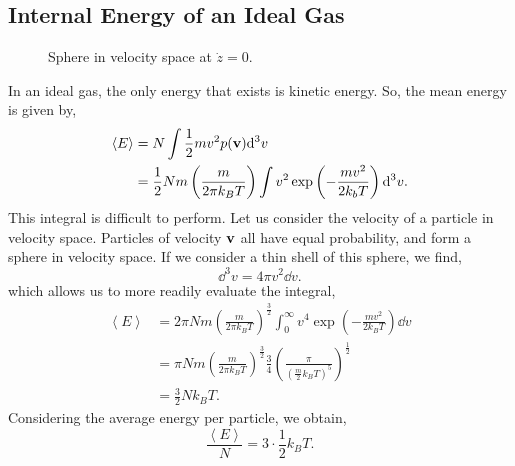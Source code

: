 \documentclass{book}
\begin{document}
\subsection{Internal Energy of an Ideal Gas}
\begin{figure}
	\centering
	\caption{Sphere in velocity space at $\Dot{z} = 0$.}
\end{figure}
In an ideal gas, the only energy that exists is kinetic energy. So, the mean energy is given by,
\begin{equation}
	\begin{split}
	\left<E\right> & = N \int \frac{1}{2}mv^2 p(\vb{v}) \dd^3 v \\
	& = \frac{1}{2}Nm\left(\frac{m}{2\pi k_BT}\right)\int v^2 \exp\left(-\frac{mv^2}{2k_bT}\right)\dd^3v.
	\end{split}
\end{equation}
This integral is difficult to perform. Let us consider the velocity of a particle in velocity space. Particles of velocity $\vb{v}$ all have equal probability, and form a sphere in velocity space. If we consider a thin shell of this sphere, we find,
\begin{equation}
	\dd^3v = 4\pi v^2 \dd{v}.
\end{equation}
which allows us to more readily evaluate the integral,
\begin{equation}
	\begin{split}
	\left<E\right> & = 2\pi Nm\left(\frac{m}{2\pi k_BT}\right)^{\frac{3}{2}}\int_0^{\infty}v^4\exp\left(-\frac{mv^2}{2k_BT}\right)\dd{v} \\
	& = \pi Nm\left(\frac{m}{2\pi k_BT}\right)^{\frac{3}{2}} \frac{3}{4}\left(\frac{\pi}{\left(\frac{m}{2}k_BT\right)^5}\right)^{\frac{1}{2}} \\
	& = \frac{3}{2}Nk_B T.
	\end{split}
\end{equation}
Considering the average energy per particle, we obtain,
\begin{equation}
	\frac{\left<E\right>}{N} = 3 \cdot \frac{1}{2}k_B T. \label{eq:energy}
\end{equation}
\end{document}
